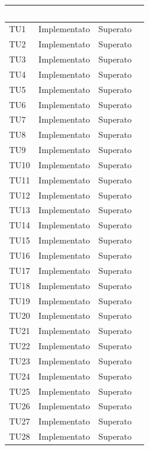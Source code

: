 \begin{longtable}{|>{\centering\arraybackslash}m{1.6cm}|>{\centering\arraybackslash}m{6.41cm}|>{\centering\arraybackslash}m{3.1cm}| c |}		
	\rowcolor{LightBlue}
	\textbf{\textcolor{white}{Test}}
	& \textbf{\textcolor{white}{Stato}}
	& \textbf{\textcolor{white}{Esito}}\\
	\hline
	TU1 & Implementato & Superato \\ \hline
	TU2 & Implementato & Superato  \\ \hline
	TU3 & Implementato & Superato  \\ \hline
	TU4 & Implementato & Superato  \\ \hline
	TU5 & Implementato & Superato  \\ \hline
	TU6 & Implementato & Superato  \\ \hline
	TU7 & Implementato & Superato  \\ \hline
	TU8 & Implementato & Superato  \\ \hline
	TU9 & Implementato & Superato  \\ \hline
	TU10 & Implementato & Superato  \\ \hline
	TU11 & Implementato & Superato  \\ \hline		
	TU12 & Implementato & Superato  \\ \hline
	TU13 & Implementato & Superato  \\ \hline
	TU14 & Implementato & Superato \\ \hline
	TU15 & Implementato & Superato  \\ \hline
	TU16 & Implementato & Superato \\ \hline
	TU17 & Implementato & Superato \\ \hline
	TU18 & Implementato & Superato \\ \hline
	TU19 & Implementato & Superato \\ \hline
	TU20 & Implementato & Superato \\ \hline
	TU21 & Implementato & Superato \\ \hline
	TU22 & Implementato & Superato \\ \hline
	TU23 & Implementato & Superato \\ \hline
	TU24 & Implementato & Superato \\ \hline
	TU25 & Implementato & Superato \\ \hline		
	TU26 & Implementato & Superato \\ \hline
	TU27 & Implementato & Superato  \\ \hline
	TU28 & Implementato & Superato  \\ \hline

\end{longtable}
